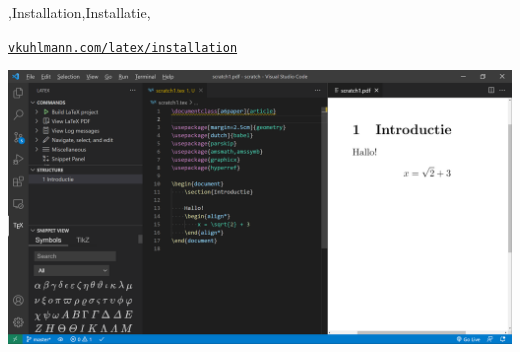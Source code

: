 \begin{frame}
    {\lang,Installation,Installatie,}

    \href{https://vkuhlmann.com/latex/installation}{\nolinkurl{vkuhlmann.com/latex/installation}}

    \includegraphics[width=\linewidth,height=0.8\textheight,keepaspectratio]{assets/VisualStudioCodeDemo.png}
\end{frame}
